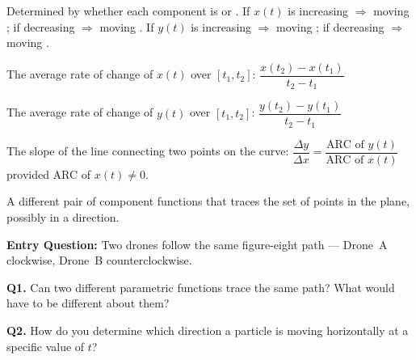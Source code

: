 \documentclass[10pt]{article}
\begin{document}
\begin{vocabbox}
\begin{description}[leftmargin=0pt, itemsep=6pt]
  \item[\termblanklong{direction of motion}]
    Determined by whether each component is
     or .
    If $x(t)$ is increasing $\Rightarrow$ moving ;
    if decreasing $\Rightarrow$ moving .
    If $y(t)$ is increasing $\Rightarrow$ moving ;
    if decreasing $\Rightarrow$ moving .

  \item[\termblanklong{ARC of $x(t)$}]
    The average rate of change of $x(t)$ over $[t_1, t_2]$:
    \quad $\dfrac{x(t_2) - x(t_1)}{t_2 - t_1}$

  \item[\termblanklong{ARC of $y(t)$}]
    The average rate of change of $y(t)$ over $[t_1, t_2]$:
    \quad $\dfrac{y(t_2) - y(t_1)}{t_2 - t_1}$

  \item[\termblanklong{slope of parametric curve}]
    The slope of the  line connecting two points
    on the curve:
    \quad $\dfrac{\Delta y}{\Delta x} = \dfrac{\text{ARC of } y(t)}{\text{ARC of } x(t)}$
    \quad provided ARC of $x(t) \ne 0$.

  \item[\termblanklong{reparametrization}]
    A different pair of component functions that traces the
     set of points in the plane, possibly in a
     direction.
\end{description}
\end{vocabbox}

\vspace{0.08in}

\begin{hookbox}
\textbf{Entry Question:} Two drones follow the same figure-eight path ---
Drone~A clockwise, Drone~B counterclockwise.

\vspace{4pt}
\textbf{Q1.} Can two different parametric functions trace the same path?
What would have to be different about them?

\vspace{4pt}

\textbf{Q2.} How do you determine which direction a particle is moving
horizontally at a specific value of $t$?

\vspace{4pt}
\end{hookbox}
\end{document}
